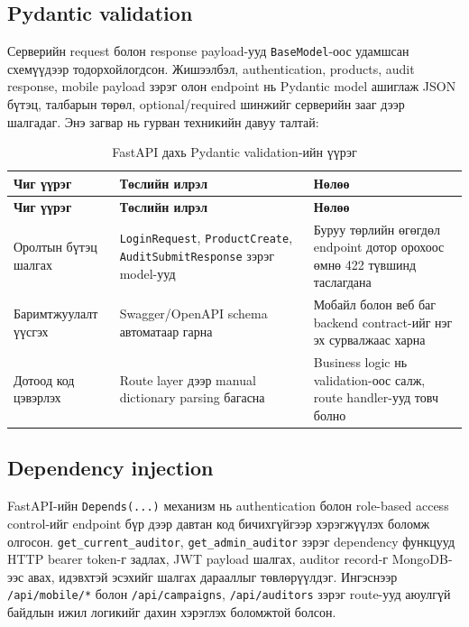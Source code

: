 \subsection{Pydantic validation}

Серверийн request болон response payload-ууд \texttt{BaseModel}-оос удамшсан схемүүдээр тодорхойлогдсон. Жишээлбэл, authentication, products, audit response, mobile payload зэрэг олон endpoint нь Pydantic model ашиглаж JSON бүтэц, талбарын төрөл, optional/required шинжийг серверийн зааг дээр шалгадаг. Энэ загвар нь гурван техникийн давуу талтай:

\begin{longtable}{|p{3.6cm}|p{4.4cm}|p{5.4cm}|}
\caption{FastAPI дахь Pydantic validation-ийн үүрэг}
\label{tab:pydantic_validation_role} \\
\hline
\textbf{Чиг үүрэг} & \textbf{Төслийн илрэл} & \textbf{Нөлөө} \\
\hline
\endfirsthead
\hline
\textbf{Чиг үүрэг} & \textbf{Төслийн илрэл} & \textbf{Нөлөө} \\
\hline
\endhead
\hline
\endfoot
Оролтын бүтэц шалгах & \texttt{LoginRequest}, \texttt{ProductCreate}, \texttt{AuditSubmitResponse} зэрэг model-ууд & Буруу төрлийн өгөгдөл endpoint дотор орохоос өмнө 422 түвшинд таслагдана \\
\hline
Баримтжуулалт үүсгэх & Swagger/OpenAPI schema автоматаар гарна & Мобайл болон веб баг backend contract-ийг нэг эх сурвалжаас харна \\
\hline
Дотоод код цэвэрлэх & Route layer дээр manual dictionary parsing багасна & Business logic нь validation-оос салж, route handler-ууд товч болно \\
\hline
\end{longtable}

\subsection{Dependency injection}

FastAPI-ийн \texttt{Depends(...)} механизм нь authentication болон role-based access control-ийг endpoint бүр дээр давтан код бичихгүйгээр хэрэгжүүлэх боломж олгосон. \texttt{get\_current\_auditor}, \texttt{get\_admin\_auditor} зэрэг dependency функцууд HTTP bearer token-г задлах, JWT payload шалгах, auditor record-г MongoDB-ээс авах, идэвхтэй эсэхийг шалгах дарааллыг төвлөрүүлдэг. Ингэснээр \texttt{/api/mobile/*} болон \texttt{/api/campaigns}, \texttt{/api/auditors} зэрэг route-ууд аюулгүй байдлын ижил логикийг дахин хэрэглэх боломжтой болсон.

